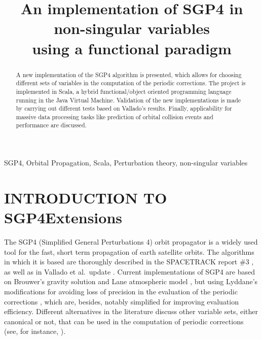 \documentclass{article}
\title{An implementation of SGP4 in non-singular variables \\
              using a functional paradigm}
\begin{document}
%
\maketitle
%
\begin{abstract}

A new implementation of the SGP4 algorithm is presented, which allows for choosing different sets of variables in the computation of the periodic corrections. The project is implemented in Scala, a hybrid functional/object oriented programming language running in the Java Virtual Machine.
Validation of the new implementations is made by carrying out different tests based on Vallado's results. Finally, applicability for massive data processing tasks like prediction of orbital collision events and performance are discussed.

\end{abstract}
%
\begin{keywords}
SGP4, Orbital Propagation, Scala, Perturbation theory, non-singular variables
\end{keywords}
%

\section{INTRODUCTION TO SGP4Extensions} \label{sec:intro}

The SGP4 (Simplified General Perturbations 4) orbit propagator is a widely used tool for the fast, short term propagation of earth satellite orbits. The algorithms in which it is based are thoroughly described in the SPACETRACK report \#3 \cite{HootsRoehrich1980}, as well as in Vallado et al.~update \cite{ValladoCrawfordHujsakKelso2006}. Current implementations of SGP4 are based on Brouwer's gravity solution \cite{Brouwer1959} and Lane atmospheric model \cite{Lane1965}, but using Lyddane's modifications for avoiding loss of precision in the evaluation of the periodic corrections \cite{Lyddane1963}, which are, besides, notably simplified for improving evaluation efficiency. Different alternatives in the literature discuss other variable sets, either canonical or not, that can be used in the computation of periodic corrections (see, for instance, \cite{Izsak1963AJ,Aksnes1972,Hoots1981,Lara2015MPE}).
\par
\end{document}
